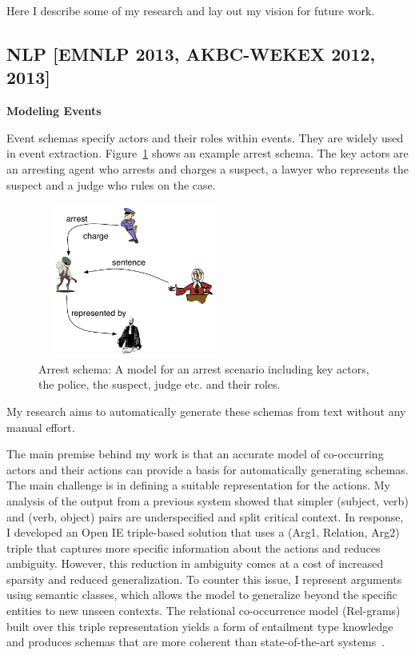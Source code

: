 \documentclass[a4paper,11pt,onecolumn]{article}
\begin{document}
Here I describe some of my research and lay out my vision for future work.

\subsection*{NLP [EMNLP 2013, AKBC-WEKEX 2012, 2013]}

{\bf Modeling Events}

Event schemas specify actors and their roles within events. 
They are widely used in event extraction. 
Figure~\ref{fig:arrest} shows an example arrest schema. 
The key actors are an arresting agent who arrests and charges a suspect, a lawyer who represents the suspect and a judge who rules on the case. 
\begin{figure}
	\vspace{-2ex}
	\begin{center}
	\includegraphics[width=2.5in,height=2in]{figures/arrest-scenario} 	
	\vspace{-2ex}
	\caption{\label{fig:arrest} {\small Arrest schema: A model for an arrest scenario including key actors, the police, the suspect, judge etc. and their roles.}}
	\vspace{-4ex}
	\end{center}
\end{figure}
My research aims to automatically generate these schemas from text without any manual effort. 

The main premise behind my work is that an accurate model of co-occurring actors and their actions can provide a basis for automatically generating schemas. The main challenge is in defining a suitable representation for the actions. My analysis of the output from a previous system showed that simpler (subject, verb) and (verb, object) pairs are underspecified and split critical context. In response, I developed an Open IE triple-based solution that uses a (Arg1, Relation, Arg2) triple that captures more specific information about the actions and reduces ambiguity. However, this reduction in ambiguity comes at a cost of increased sparsity and reduced generalization. 
To counter this issue, I represent arguments using semantic classes, which allows the model to generalize beyond the specific entities to new unseen contexts. The relational co-occurrence model (Rel-grams) built over this triple representation yields a form of entailment type knowledge~\cite{balasubramanian-akbc12} and produces schemas that are more coherent than state-of-the-art systems~\cite{balasubramanian-emnlp13}.
\end{document}
